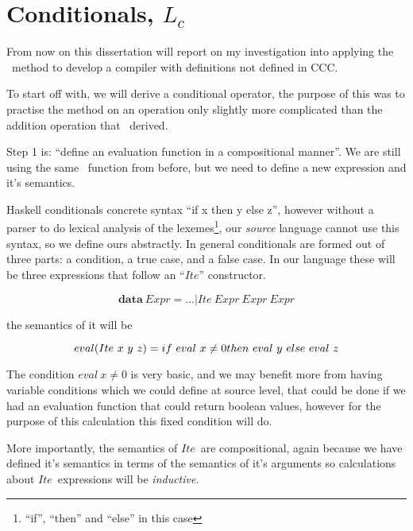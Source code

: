\documentclass {article}
\begin{document}

\section{Conditionals, $L_c$}

From now on this dissertation will report on my
investigation into applying the \BH\ method to develop a compiler
with definitions not defined in CCC.

To start off with, we will derive a conditional operator,
the purpose of this was to practise the method
on an operation only slightly more complicated than
the addition operation that \BH\ derived.

\newcommand{\ite}{$Ite$}

Step 1 is: 
``define an evaluation function in a compositional manner''.
We are still using the same \eval\ function from before,
but we need to define a new 
expression and it's semantics.

Haskell conditionals concrete
syntax ``if  x then y else z'',
however without a parser to do
lexical analysis\cite[chapter 2.2]{dragon} of the lexemes\footnote{
``if'', ``then'' and ``else'' in this case},
our \emph{source} language cannot use this
syntax, so we define ours abstractly.
In general conditionals are formed out of three parts:
a condition, a true case, and a false case.
In our language these will be three expressions
that follow an ``\ite'' constructor.

	\[ \textbf{data}\ Expr = ... | Ite\ Expr\ Expr\ Expr \]

the semantics of it will be

\begin{equation}
eval(Ite\ x\ y\ z) \\
	= if\ eval\ x \not= 0 then\ eval\ y\ else\ eval\ z 
			\label{evalite}
\end{equation}

The condition $eval\ x  \not= 0$ is very basic,
and we may benefit more from having variable conditions
which we could define at source level,
that could be done if we had an evaluation function 
that could return boolean values, 
however for the purpose of this calculation
this fixed condition will do.

More importantly, the semantics of \ite\
are compositional, 
again because we have defined it's
semantics in terms of the semantics of 
it's arguments so
calculations about \ite\ expressions
will be \emph{inductive}.
\end{document}
